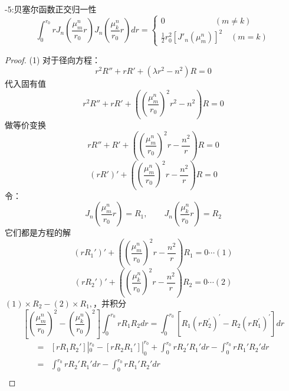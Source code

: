 \begin{proposition}-5:贝塞尔函数正交归一性
	\begin{equation*}
		\int_0 ^{r_0} r J_n (\frac{\mu_{m} ^{n}}{r_0}r) J_n (\frac{\mu_{k} ^{n}}{r_0}r) dr =
		\left\{
		\begin{aligned}
			0  \qquad \qquad \qquad (m \ne k)\\
			\frac{1}{2} r_0^2 [J'_n(\mu_m ^n)]^2 \quad (m = k)
		\end{aligned}\right.
	\end{equation*}
	\end{proposition}
\begin{proof}
	(1) 对于径向方程：
	\begin{equation*}
		r^2 R''+r R' +(\lambda r^2 -n^2)R=0
	\end{equation*}
	代入固有值
	\begin{equation*}
		r^2 R''+r R' +((\frac{\mu_{m}^{n}}{r_0})^2 r^2 -n^2)R=0 
	\end{equation*}	
	做等价变换
	\begin{equation*}
		r R''+ R' +((\frac{\mu_{m}^{n}}{r_0})^2 r -\frac{n^2}{r})R=0  
	\end{equation*}	
	\begin{equation*}
		(r R')' +((\frac{\mu_{m}^{n}}{r_0})^2 r -\frac{n^2}{r})R=0  
	\end{equation*}	
	 令：\[J_n (\frac{\mu_{m}^{n}}{r_0}r)=R_1, \qquad J_n (\frac{\mu_{k}^{n}}{r_0}r) =R_2\]
	它们都是方程的解
	\begin{equation*}
		(r R_1')' +((\frac{\mu_{m}^{n}}{r_0})^2 r -\frac{n^2}{r})R_1=0  \cdots (1)
	\end{equation*}	 
	\begin{equation*}
		(r R_2')' +((\frac{\mu_{k}^{n}}{r_0})^2 r -\frac{n^2}{r})R_2=0  \cdots (2) 
	\end{equation*}	
	$(1)\times R_2-(2)\times R_1,$，并积分
	\begin{equation*}	
		\left[\left(\frac{\mu_{m}^{n}}{r_0}\right)^{2}-\left(\frac{\mu_{k}^{n}}{r_0}\right)^{2}\right] \int_0 ^{r_0} r R_{1} R_{2} dr 
		=\int_0 ^{r_0}  [R_{1}\left(r R_{2}^{\prime}\right)^{\prime}-R_{2}\left(r R_{1}^{\prime}\right)^{\prime}] dr
	\end{equation*}
	\begin{equation*}
		\begin{split}
			=& [r R_1 R_2']|_0 ^{r_0} - [r R_2 R_1']|_0 ^{r_0} + \int_0 ^{r_0} r R_2' R_1' dr - \int_0 ^{r_0} rR_1' R_2' dr\\
			=& \int_0 ^{r_0} rR_2'R_1' dr - \int_0 ^{r_0} rR_1'R_2' dr\\

\end{split}
\end{equation*}
\end{proof}
